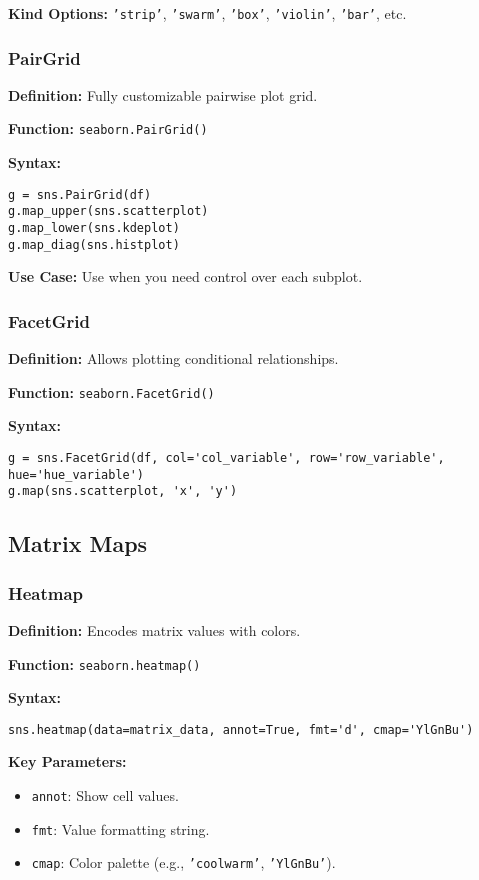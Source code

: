\textbf{Kind Options:} \texttt{'strip'}, \texttt{'swarm'}, \texttt{'box'}, \texttt{'violin'}, \texttt{'bar'}, etc.

\subsubsection{PairGrid}
\textbf{Definition:} Fully customizable pairwise plot grid.

\textbf{Function:} \texttt{seaborn.PairGrid()}

\textbf{Syntax:}
\begin{verbatim}
g = sns.PairGrid(df)
g.map_upper(sns.scatterplot)
g.map_lower(sns.kdeplot)
g.map_diag(sns.histplot)
\end{verbatim}

\textbf{Use Case:} Use when you need control over each subplot.

\subsubsection{FacetGrid}
\textbf{Definition:} Allows plotting conditional relationships.

\textbf{Function:} \texttt{seaborn.FacetGrid()}

\textbf{Syntax:}
\begin{verbatim}
g = sns.FacetGrid(df, col='col_variable', row='row_variable', hue='hue_variable')
g.map(sns.scatterplot, 'x', 'y')
\end{verbatim}

\subsection{Matrix Maps}

\subsubsection{Heatmap}
\textbf{Definition:} Encodes matrix values with colors.

\textbf{Function:} \texttt{seaborn.heatmap()}

\textbf{Syntax:}
\begin{verbatim}
sns.heatmap(data=matrix_data, annot=True, fmt='d', cmap='YlGnBu')
\end{verbatim}

\textbf{Key Parameters:}
\begin{itemize}
    \item \texttt{annot}: Show cell values.
    \item \texttt{fmt}: Value formatting string.
    \item \texttt{cmap}: Color palette (e.g., \texttt{'coolwarm'}, \texttt{'YlGnBu'}).
\end{itemize}

